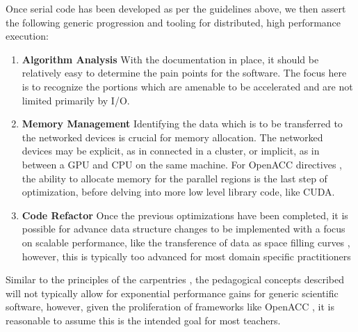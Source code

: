 \documentclass[conference]{IEEEtran}
\begin{document}
Once serial code has been developed as per the guidelines above, we then assert the following generic progression and tooling for distributed, high performance execution:
\begin{enumerate}
	\item \textbf{Algorithm Analysis} With the documentation in place, it should be relatively easy to determine the pain points for the software. The focus here is to recognize the portions which are amenable to be accelerated and are not limited primarily by I/O.
	\item \textbf{Memory Management} Identifying the data which is to be transferred to the networked devices is crucial for memory allocation. The networked devices may be explicit, as in connected in a cluster, or implicit, as in between a GPU and CPU on the same machine. For OpenACC directives \cite{farberParallelProgrammingOpenACC2016}, the ability to allocate memory for the parallel regions is the last step of optimization, before delving into more low level library code, like CUDA.
	\item \textbf{Code Refactor} Once the previous optimizations have been completed, it is possible for advance data structure changes to be implemented with a focus on scalable performance, like the transference of data as space filling curves \cite{goswamiSpaceFillingCurves2019}, however, this is typically too advanced for most domain specific practitioners
\end{enumerate}
Similar to the principles of the carpentries \cite{wilsonSoftwareCarpentryGetting2006a}, the pedagogical concepts described will not typically allow for exponential performance gains for generic scientific software, however, given the proliferation of frameworks like OpenACC \cite{farberParallelProgrammingOpenACC2016}, it is reasonable to assume this is the intended goal for most teachers.
\end{document}

